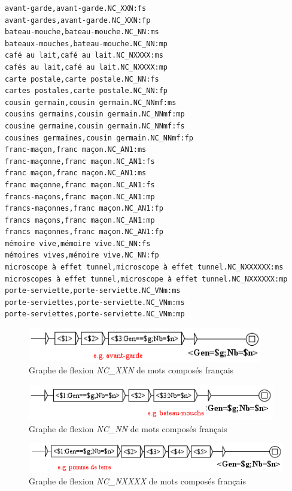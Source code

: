 \begin{verbatim}
avant-garde,avant-garde.NC_XXN:fs
avant-gardes,avant-garde.NC_XXN:fp
bateau-mouche,bateau-mouche.NC_NN:ms
bateaux-mouches,bateau-mouche.NC_NN:mp
café au lait,café au lait.NC_NXXXX:ms
cafés au lait,café au lait.NC_NXXXX:mp
carte postale,carte postale.NC_NN:fs
cartes postales,carte postale.NC_NN:fp
cousin germain,cousin germain.NC_NNmf:ms
cousins germains,cousin germain.NC_NNmf:mp
cousine germaine,cousin germain.NC_NNmf:fs
cousines germaines,cousin germain.NC_NNmf:fp
franc-maçon,franc maçon.NC_AN1:ms
franc-maçonne,franc maçon.NC_AN1:fs
franc maçon,franc maçon.NC_AN1:ms
franc maçonne,franc maçon.NC_AN1:fs
francs-maçons,franc maçon.NC_AN1:mp
francs-maçonnes,franc maçon.NC_AN1:fp
francs maçons,franc maçon.NC_AN1:mp
francs maçonnes,franc maçon.NC_AN1:fp
mémoire vive,mémoire vive.NC_NN:fs
mémoires vives,mémoire vive.NC_NN:fp
microscope à effet tunnel,microscope à effet tunnel.NC_NXXXXXX:ms
microscopes à effet tunnel,microscope à effet tunnel.NC_NXXXXXX:mp
porte-serviette,porte-serviette.NC_VNm:ms
porte-serviettes,porte-serviette.NC_VNm:ms
porte-serviettes,porte-serviette.NC_VNm:mp 
\end{verbatim}

\begin{figure}[!htb]
  \centering
  \includegraphics[width=10.2cm]{resources/img/NC'XXN'FR.png}
  \caption{Graphe de flexion \emph{NC\_XXN} de mots composés français}
  \label{fig:NC'XXN'FR}
\end{figure}

\begin{figure}[!htb]
  \centering
  \includegraphics[width=10.8cm]{resources/img/NC'NN'FR.png}
  \caption{Graphe de flexion \emph{NC\_NN} de mots composés français}
  \label{fig:NC'NN'FR}
\end{figure}

\begin{figure}[!htb]
  \centering
  \includegraphics[width=12cm]{resources/img/NC'NXXXX'FR.png}
  \caption{Graphe de flexion \emph{NC\_NXXXX} de mots composés français}
  \label{fig:NC'NXXXX'FR}
\end{figure}

